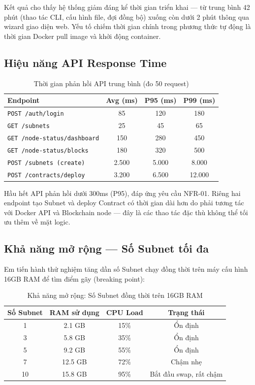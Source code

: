 Kết quả cho thấy hệ thống giảm đáng kể thời gian triển khai --- từ trung bình 42 phút (thao tác CLI, cấu hình file, đợi đồng bộ) xuống còn dưới 2 phút thông qua wizard giao diện web. Yếu tố chiếm thời gian chính trong phương thức tự động là thời gian Docker pull image và khởi động container.

\subsection{Hiệu năng API Response Time}

\begin{table}[H]
\centering
\caption{Thời gian phản hồi API trung bình (đo 50 request)}
\label{tab:api_performance}
\begin{tabular}{|l|c|c|c|}
\hline
\textbf{Endpoint} & \textbf{Avg (ms)} & \textbf{P95 (ms)} & \textbf{P99 (ms)} \\ \hline
\texttt{POST /auth/login} & 85 & 120 & 180 \\ \hline
\texttt{GET /subnets} & 25 & 45 & 65 \\ \hline
\texttt{GET /node-status/dashboard} & 150 & 280 & 450 \\ \hline
\texttt{GET /node-status/blocks} & 180 & 320 & 500 \\ \hline
\texttt{POST /subnets (create)} & 2.500 & 5.000 & 8.000 \\ \hline
\texttt{POST /contracts/deploy} & 3.200 & 6.500 & 12.000 \\ \hline
\end{tabular}
\end{table}

Hầu hết API phản hồi dưới 300ms (P95), đáp ứng yêu cầu NFR-01. Riêng hai endpoint tạo Subnet và deploy Contract có thời gian dài hơn do phải tương tác với Docker API và Blockchain node --- đây là các thao tác đặc thù không thể tối ưu thêm về mặt logic.

\subsection{Khả năng mở rộng --- Số Subnet tối đa}

Em tiến hành thử nghiệm tăng dần số Subnet chạy đồng thời trên máy cấu hình 16GB RAM để tìm điểm gãy (breaking point):

\begin{table}[H]
\centering
\caption{Khả năng mở rộng: Số Subnet đồng thời trên 16GB RAM}
\label{tab:scalability}
\begin{tabular}{|c|c|c|c|}
\hline
\textbf{Số Subnet} & \textbf{RAM sử dụng} & \textbf{CPU Load} & \textbf{Trạng thái} \\ \hline
1 & 2.1 GB & 15\% & Ổn định \\ \hline
3 & 5.8 GB & 35\% & Ổn định \\ \hline
5 & 9.2 GB & 55\% & Ổn định \\ \hline
7 & 12.5 GB & 72\% & Chậm nhẹ \\ \hline
10 & 15.8 GB & 95\% & Bắt đầu swap, rất chậm \\ \hline
\end{tabular}
\end{table}


